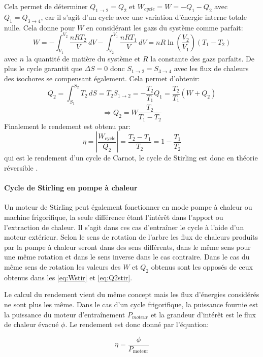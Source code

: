 Cela permet de déterminer \(Q_{1\to2} = Q_2\) et \(W_{cycle} = W = -Q_1 - Q_2\) avec \(Q_1 = Q_{3\to4}\), car il s'agit d'un cycle avec une variation d'énergie interne totale nulle. Cela donne pour \(W\) en considérant les gazs du système comme parfait:
\begin{equation}
    W = - \int_{V_1}^{V_2} \frac{nRT_2}{V} \, dV - \int_{V_2}^{V_1} \frac{nRT_1}{V} \, dV = nR\ln\left(\frac{V_2}{V_1}\right) (T_1 - T_2)
    \label{eq:Wstir}
\end{equation}
avec \(n\) la quantité de matière du système et \(R\) la constante des gazs parfaits.
De plus le cycle garantit que \(\Delta S = 0\) donc \(S_{1\to2} = S_{3\to4}\) avec les flux de chaleurs des isochores se compensant également. Cela permet d'obtenir:
\begin{equation}
    Q_2 = \int_{S_1}^{S_2} T_2 \, dS = T_2 S_{1\to2} = -\frac{T_2}{T_1} Q_1 = \frac{T_2}{T_1} (W + Q_2)
\end{equation}
\begin{equation}
    \Rightarrow Q_2 = W \frac{T_2}{T_1 - T_2}
    \label{eq:Q2stir}
\end{equation}
Finalement le rendement est obtenu par:
\begin{equation}
    \eta = \left|\frac{W_\textrm{cycle}}{Q_2}\right| = \frac{T_2 - T_1}{T_2} = 1 - \frac{T_1}{T_2}
    \label{eq:rend-theorie}
\end{equation}
qui est le rendement d'un cycle de Carnot, le cycle de Stirling est donc en théorie réversible \cite{cours-thermo}.

\paragraph*{Cycle de Stirling en pompe à chaleur}
Un moteur de Stirling peut également fonctionner en mode pompe à chaleur ou machine frigorifique, la seule différence étant l'intérêt dans l'apport ou l'extraction de chaleur. Il s'agit dans ces cas d'entraîner le cycle à l'aide d'un moteur extérieur. Selon le sens de rotation de l'arbre les flux de chaleurs produits par la pompe à chaleur seront dans des sens différents, dans le même sens pour une même rotation et dans le sens inverse dans le cas contraire. Dans le cas du même sens de rotation les valeurs des \(W\) et \(Q_2\) obtenus sont les opposés de ceux obtenus dans les \autoref{eq:Wstir} et \autoref{eq:Q2stir}.

Le calcul du rendement vient du même concept mais les flux d'énergies considérés ne sont plus les même. Dans le cas d'un cycle frigorifique, la puissance fournie est la puissance du moteur d'entraînement \(P_{moteur}\) et la grandeur d'intérêt est le flux de chaleur évacué \(\phi\). Le rendement est donc donné par l'équation:

\begin{equation}
    \eta = \frac{\phi}{P_\textrm{moteur}}
    \label{eq:rend-frigo}
\end{equation}